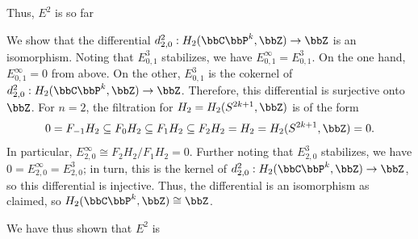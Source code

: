 \begin{example}
    Thus, $E^2$ is so far
    \begin{center}
    \small
    \end{center}

    We show that the differential $d_{2,0}^2: H_2(\bbC\bbP^k, \bbZ) \to \bbZ$ is an isomorphism. Noting that $E_{0,1}^3$ stabilizes, we have $E_{0,1}^\infty = E_{0,1}^3$. On the one hand, $E_{0,1}^\infty = 0$ from above. On the other, $E_{0,1}^3$ is the cokernel of $d_{2,0}^2: H_2(\bbC\bbP^k, \bbZ) \to \bbZ$. Therefore, this differential is surjective onto $\bbZ$. 
    For $n = 2$, the filtration for $H_2 = H_2(S^{2k+1}, \bbZ)$ is of the form 
    $$0 = F_{-1} H_2 \subseteq F_0 H_2 \subseteq F_1 H_2 \subseteq F_2 H_2 = H_2 = H_2(S^{2k+1}, \bbZ) = 0.$$
    In particular, $E_{2,0}^\infty \cong F_2 H_2 / F_1 H_2 = 0$. Further noting that $E_{2,0}^3$ stabilizes, we have $0 = E_{2,0}^\infty = E_{2,0}^3$; in turn, this is the kernel of $d_{2,0}^2: H_2(\bbC\bbP^k, \bbZ) \to \bbZ$, so this differential is injective. Thus, the differential is an isomorphism as claimed, so $H_2(\bbC\bbP^k, \bbZ) \cong \bbZ$. 

    We have thus shown that $E^2$ is 
    \begin{center}
    \small
    \end{center}


\end{example}
